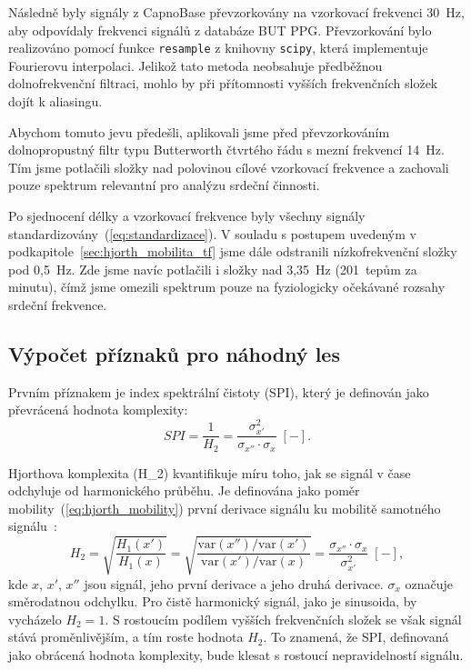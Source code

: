 Následně byly signály z CapnoBase převzorkovány na vzorkovací frekvenci 30~Hz, aby odpovídaly frekvenci signálů z databáze \acs{BUT PPG}.
Převzorkování bylo realizováno pomocí funkce \texttt{resample} z knihovny \texttt{scipy}, která implementuje Fourierovu interpolaci.
Jelikož tato metoda neobsahuje předběžnou dolnofrekvenční filtraci, mohlo by při přítomnosti vyšších frekvenčních složek dojít k aliasingu.

Abychom tomuto jevu předešli, aplikovali jsme před převzorkováním dolnopropustný filtr typu Butterworth čtvrtého řádu s mezní frekvencí 14~Hz.
Tím jsme potlačili složky nad polovinou cílové vzorkovací frekvence a zachovali pouze spektrum relevantní pro analýzu srdeční činnosti.

Po sjednocení délky a vzorkovací frekvence byly všechny signály standardizovány~(\ref{eq:standardizace}).
V souladu s postupem uvedeným v podkapitole~\ref{sec:hjorth_mobilita_tf} jsme dále odstranili nízkofrekvenční složky pod 0,5~Hz.
Zde jsme navíc potlačili i složky nad 3,35~Hz (201~tepům za minutu), čímž jsme omezili spektrum pouze na fyziologicky očekávané rozsahy srdeční frekvence.

\subsection*{Výpočet příznaků pro náhodný les}
\label{subsec:rf_features}
Prvním příznakem je index spektrální čistoty (\acs{SPI}), který je definován jako převrácená hodnota komplexity:
\begin{equation}
	\label{eq:hjorth_SPI}
	SPI = \frac{1}{H_2} = \frac{\sigma_{x'}^2}{\sigma_{x''} \cdot \sigma_{x}} \; [-].
\end{equation}

Hjorthova komplexita (\acs{H_2}) kvantifikuje míru toho, jak se signál v čase odchyluje od harmonického průběhu.
Je definována jako poměr mobility~(\ref{eq:hjorth_mobility}) první derivace signálu ku mobilitě samotného signálu~\cite{Hjorth1970,Geetika2022}:
\begin{equation}
	\label{eq:hjorth_complexity}
	H_{2} = \sqrt{ \frac{H_1(x')}{H_1(x)} }
	= \sqrt{ \frac{ \text{var}(x'') / \text{var}(x') }{ \text{var}(x') / \text{var}(x) } }
	= \frac{ \sigma_{x''} \cdot \sigma_{x} }{ \sigma_{x'}^2 } \; [-],
\end{equation}
kde $x$, $x'$, $x''$ jsou signál, jeho první derivace a jeho druhá derivace.
$\sigma_x$ označuje směrodatnou odchylku.
Pro čistě harmonický signál, jako je sinusoida, by vycházelo $H_2 = 1$.
S rostoucím podílem vyšších frekvenčních složek se však signál stává proměnlivějším, a tím roste hodnota \( H_2 \).
To znamená, že \acs{SPI}, definovaná jako obrácená hodnota komplexity, bude klesat s rostoucí nepravidelností signálu.

